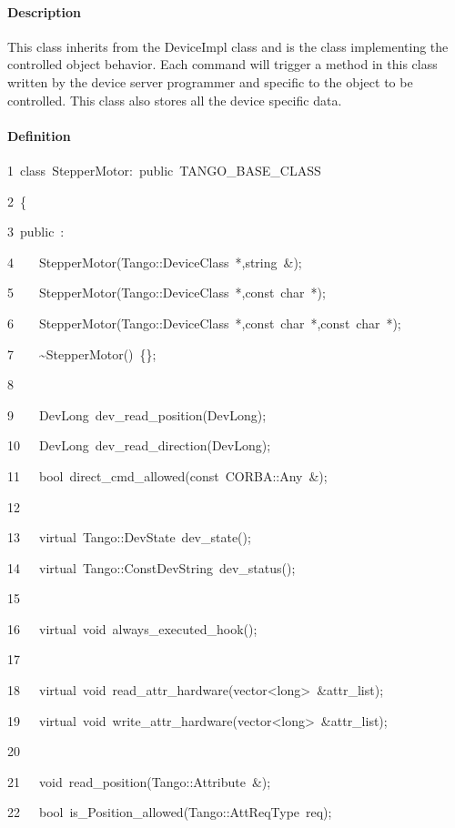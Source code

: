 \paragraph{Description}

This class inherits from the DeviceImpl class and
is the class implementing the controlled object behavior. Each command
will trigger a method in this class written by the device server programmer
and specific to the object to be controlled. This class also stores
all the device specific data.

\paragraph{Definition}


\begin{lyxcode}
1~class~StepperMotor:~public~TANGO\_BASE\_CLASS

2~\{

3~public~:

4~~~~StepperMotor(Tango::DeviceClass~{*},string~\&);

5~~~~StepperMotor(Tango::DeviceClass~{*},const~char~{*});

6~~~~StepperMotor(Tango::DeviceClass~{*},const~char~{*},const~char~{*});

7~~~~\textasciitilde{}StepperMotor()~\{\};

8~

9~~~~DevLong~dev\_read\_position(DevLong);

10~~~DevLong~dev\_read\_direction(DevLong);

11~~~bool~direct\_cmd\_allowed(const~CORBA::Any~\&);

12~

13~~~virtual~Tango::DevState~dev\_state();

14~~~virtual~Tango::ConstDevString~dev\_status();

15~

16~~~virtual~void~always\_executed\_hook();

17~

18~~~virtual~void~read\_attr\_hardware(vector<long>~\&attr\_list);

19~~~virtual~void~write\_attr\_hardware(vector<long>~\&attr\_list);

20~

21~~~void~read\_position(Tango::Attribute~\&);

22~~~bool~is\_Position\_allowed(Tango::AttReqType~req);


\end{lyxcode}
